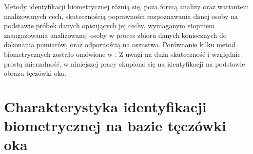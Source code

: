 Metody identyfikacji biometrycznej różnią się, poza formą analizy oraz wariantem analizowanych cech, skutecznością poprawności rozpoznawania danej osoby na podstawie próbek danych opisujących jej cechy, wymaganym stopniem zaangażowania analizowanej osoby w proces zbioru danych koniecznych do dokonania pomiarów, oraz odpornością na oszustwa. Porównanie kilku metod biometrycznych zostało omówione w \cite{Gl11}. Z uwagi na dużą skuteczność i względnie prostą mierzalność, w niniejszej pracy skupiono się na identyfikacji na podstawie obrazu tęczówki oka.



\section{Charakterystyka identyfikacji biometrycznej na bazie tęczówki oka}
\label{sec:zawartoscPracy}


